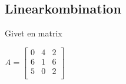 \subsection{Linearkombination}

Givet en matrix 

$A=
\begin{bmatrix}
0 & 4 & 2 \\
6 & 1 & 6 \\
5 & 0 & 2 \\
\end{bmatrix}
$